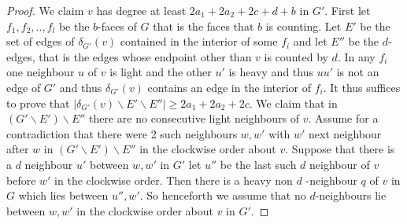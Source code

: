 \documentclass{article}
\newcommand{\0}{\mathbb{0}}
\newcommand{\1}{\mathbb{1}}
\begin{document}
\begin{proof}
We claim $v$ has degree at least  $2a_1 +2a_2+2c+d +b  $ in $G'$. First let $f_1, f_2,.., f_l$ be the $b$-faces of $G$ that is the faces that $b$ is counting. Let $E'$ be the set of edges of $\delta_{G'} (v)$ contained in the interior of some $f_i$ and let $E''$ be the $d$-edges, that is the edges whose endpoint other than $v$ is counted by $d$.  In any $f_i$ one neighbour $u$ of $v$ is light and the other $u'$ is heavy and thus $uu'$ is not an edge of $G'$ and thus $ \delta_{G'}(v) $ contains an edge in the interior of $f_i$. It thus suffices to prove that $ | \delta_{G'}(v) \backslash E' \backslash E'' | \geq  2a_1 +2a_2+2c$.  We claim that in $ (G' \backslash E' ) \backslash E'' $ there are no consecutive light neighbours of $v$. Assume for a contradiction that there were 2 such neighbours $w,w'$ with $w'$ next neighbour after $w$ in $ (G' \backslash E' ) \backslash E'' $ in the clockwise order about $v$. Suppose that there is a $d$ neighbour $u'$ between $w,w'$ in $G'$ let $u''$ be the last such $d$ neighbour of $ v $ before $w'$ in the clockwise order. Then there is a heavy non $d$ -neighbour $q$ of $v$ in $G$  which lies between $ u'',w' $.  So henceforth we assume that no $d$-neighbours lie between $w, w'$ in the clockwise order about $v$ in $G'$.  


\end{proof}
\end{document}
